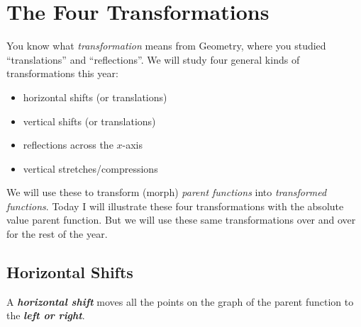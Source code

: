 

\section*{The Four Transformations}

You know what \emph{transformation} means from Geometry, 
where you studied ``translations'' and ``reflections''.
We will study four general kinds of transformations this year:
\begin{itemize}[itemsep=0in]
    \item horizontal shifts (or translations)
    \item vertical shifts (or translations)
    \item reflections across the $x$-axis
    \item vertical stretches/compressions
\end{itemize}

We will use these to transform (morph) \emph{parent functions} into \emph{transformed functions}.
Today I will illustrate these four transformations with the absolute value parent function.
But we will use these same transformations over and over for the rest of the year.





\newpage
\subsection*{Horizontal Shifts}

\begin{center}
    \begin{tcolorbox}[width=4in]
        A {\bfseries\itshape horizontal shift} 
        moves all the points on the graph of the parent function
        to the {\bfseries\itshape left or right}.
    \end{tcolorbox}
\end{center}


